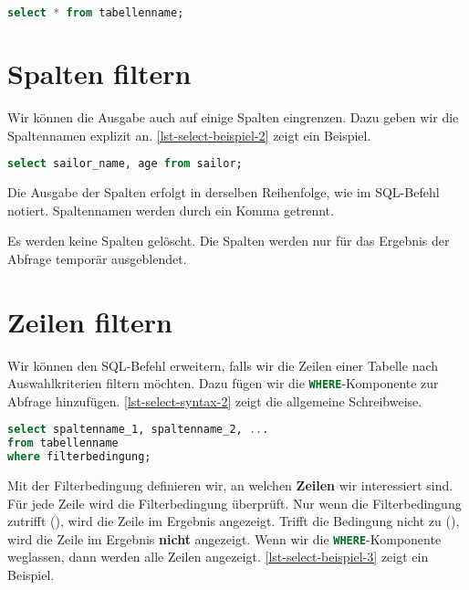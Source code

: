 \begin{lstlisting}[language=SQL, upquote=true, morekeywords={real, text}, caption={Der Befehl kann auch auf mehrere Zeilen verteilt werden.}, label	={lst-select-syntax-1}]
select * from tabellenname;
\end{lstlisting}

\section{Spalten filtern}

Wir können die Ausgabe auch auf einige Spalten eingrenzen. Dazu geben wir die Spaltennamen explizit an. \autoref{lst-select-beispiel-2} zeigt ein Beispiel.

\begin{lstlisting}[language=SQL, upquote=true, morekeywords={real, text}, caption={Es werden alle Zeilen der Tabelle ausgegeben, jedoch nur zwei Spalten.}, label={lst-select-beispiel-2}]
select sailor_name, age from sailor;
\end{lstlisting}

Die Ausgabe der Spalten erfolgt in derselben Reihenfolge, wie im \ac{SQL}-Befehl notiert. Spaltennamen werden durch ein Komma getrennt.

\begin{important}
Es werden keine Spalten gelöscht. Die Spalten werden nur für das Ergebnis der Abfrage temporär ausgeblendet.
\end{important}

\section{Zeilen filtern}

Wir können den \ac{SQL}-Befehl erweitern, falls wir die Zeilen einer Tabelle nach Auswahlkriterien filtern möchten. Dazu fügen wir die \lstinline[language=SQL]{WHERE}-Komponente zur Abfrage hinzufügen. \autoref{lst-select-syntax-2} zeigt die allgemeine Schreibweise.

\begin{lstlisting}[language=SQL, upquote=true, morekeywords={real, text}, caption={Es werden alle Zeilen der Tabelle ausgegeben, jedoch nur zwei Spalten.}, label={lst-select-syntax-2}]
select spaltenname_1, spaltenname_2, ...
from tabellenname
where filterbedingung;
\end{lstlisting}

Mit der Filterbedingung definieren wir, an welchen \textbf{Zeilen} wir interessiert sind. Für jede Zeile wird die Filterbedingung überprüft. Nur wenn die Filterbedingung zutrifft (), wird die Zeile im Ergebnis angezeigt. Trifft die Bedingung nicht zu (), wird die Zeile im Ergebnis \textbf{nicht} angezeigt. Wenn wir die \lstinline[language=SQL]{WHERE}-Komponente weglassen, dann werden alle Zeilen angezeigt. \autoref{lst-select-beispiel-3} zeigt ein Beispiel.

